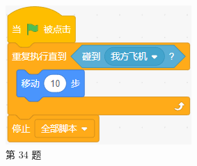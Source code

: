 \documentclass[10pt, a4paper]{article}
\begin{document}
\begin{enumerate}
\begin{figure}[htbp]
\begin{minipage}[t]{.36\textwidth}
\begin{minipage}[t]{.4\textwidth}
                \end{minipage}
                \begin{minipage}[t]{.52\textwidth}
                    \centering
                    \includegraphics[width=\textwidth]{figure/34-2.png}
                \end{minipage}
                \caption*{第 34 题}
            \end{minipage}
            \begin{minipage}[t]{.1\textwidth}
                \centering

\end{minipage}
\end{figure}
\end{enumerate}
\end{document}

